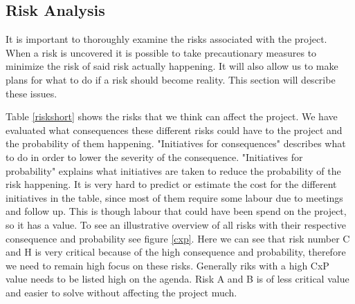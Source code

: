 \subsection{Risk Analysis}
\label{risk}
It is important to thoroughly examine the risks associated with the project. When a risk is uncovered it is possible to take precautionary measures to minimize the risk of said risk actually happening. It will also allow us to make plans for what to do if a risk should become reality. This section will describe these issues.

Table \ref{riskshort} shows the risks that we think can affect the project. 
We have evaluated what consequences these different risks could have to the project and the probability of them happening.
"Initiatives for consequences" describes what to do in order to lower the severity of the consequence.
"Initiatives for probability" explains what initiatives are taken to reduce the probability of the risk happening.
It is very hard to predict or estimate the cost for the different initiatives in the table, since most of them require some labour due to meetings and follow up. 
This is though labour that could have been spend on the project, so it has a value. 
To see an illustrative overview of all risks with their respective consequence and probability see figure \ref{cxp}.
Here we can see that risk number C and H is very critical because of the high consequence and probability, therefore we need to remain high focus on these risks. Generally riks with a high CxP value needs to be listed high on the agenda. 
Risk A and B is of less critical value and easier to solve without affecting the project much.


